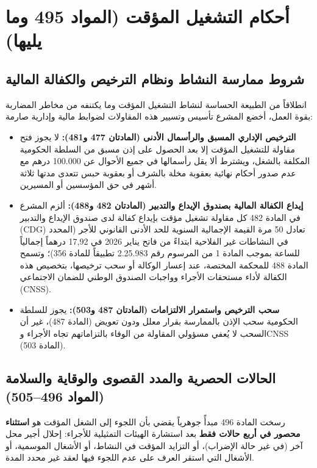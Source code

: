 \section{أحكام التشغيل المؤقت (المواد 495 وما يليها)}

\subsection{شروط ممارسة النشاط ونظام الترخيص والكفالة المالية}
انطلاقاً من الطبيعة الحساسة لنشاط التشغيل المؤقت وما يكتنفه من مخاطر المضاربة بقوة العمل، أخضع المشرع تأسيس وتسيير هذه المقاولات لضوابط مالية وإدارية صارمة:
\begin{itemize}[leftmargin=*, itemsep=5pt]
    \item \textbf{الترخيص الإداري المسبق والرأسمال الأدنى (المادتان \textenglish{477} و\textenglish{481}):} لا يجوز فتح مقاولة للتشغيل المؤقت إلا بعد الحصول على إذن مسبق من السلطة الحكومية المكلفة بالشغل، ويشترط ألا يقل رأسمالها في جميع الأحوال عن \textenglish{100.000} درهم مع عدم صدور أحكام نهائية بعقوبة مخلة بالشرف أو بعقوبة حبس تتعدى مدتها ثلاثة أشهر في حق المؤسسين أو المسيرين.
    \item \textbf{إيداع الكفالة المالية بصندوق الإيداع والتدبير (المادتان \textenglish{482} و\textenglish{488}):} ألزم المشرع في المادة \textenglish{482} كل مقاولة تشغيل مؤقت بإيداع كفالة لدى صندوق الإيداع والتدبير (\textenglish{CDG}) تعادل \textenglish{50} مرة القيمة الإجمالية السنوية للحد الأدنى القانوني للأجر (المحدد في النشاطات غير الفلاحية ابتداءً من فاتح يناير \textenglish{2026} في \textenglish{17,92} درهماً إجمالياً للساعة بموجب المادة \textenglish{1} من المرسوم رقم \textenglish{2.25.983} تطبيقاً للمادة \textenglish{356})؛ وتسمح المادة \textenglish{488} للمحكمة المختصة، عند إعسار الوكالة أو سحب ترخيصها، بتخصيص هذه الكفالة لأداء مستحقات الأجراء وواجبات الصندوق الوطني للضمان الاجتماعي (\textenglish{CNSS}).
    \item \textbf{سحب الترخيص واستمرار الالتزامات (المادتان \textenglish{487} و\textenglish{503}):} يجوز للسلطة الحكومية سحب الإذن بالممارسة بقرار معلل ودون تعويض (المادة \textenglish{487})، غير أن السحب لا يُعفي مسؤولي المقاولة من الوفاء بالتزاماتهم تجاه الأجراء و\textenglish{CNSS} (المادة \textenglish{503}).
\end{itemize}

\subsection{الحالات الحصرية والمدد القصوى والوقاية والسلامة (المواد 496--505)}
رسخت المادة \textenglish{496} مبدأً جوهرياً يقضي بأن اللجوء إلى الشغل المؤقت هو \textbf{استثناء محصور في أربع حالات فقط} بعد استشارة الهيئات التمثيلية للأجراء: إحلال أجير محل آخر (في غير حالة الإضراب)، أو التزايد المؤقت في النشاط، أو الأشغال الموسمية، أو الأشغال التي استقر العرف على عدم اللجوء فيها لعقد غير محدد المدة.


